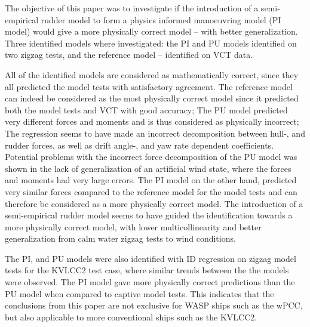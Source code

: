 %
The objective of this paper was to investigate if the introduction of a semi-empirical rudder model to form a physics informed manoeuvring model (PI model) would give a more physically correct model -- with better generalization.
Three identified models where investigated: the PI and PU models identified on two zigzag tests, and the reference model -- identified on VCT data.

All of the identified models are considered as mathematically correct, since they all predicted the model tests with satisfactory agreement.
The reference model can indeed be considered as the most physically correct model since it predicted both the model tests and VCT with good accuracy;
The PU model predicted very different forces and moments and is thus considered as physically incorrect; 
The regression seems to have made an incorrect decomposition between hull-, and rudder forces, as well as drift angle-, and yaw rate dependent coefficients.
Potential problems with the incorrect force decomposition of the PU model was shown in the lack of generalization of an artificial wind state, where the forces and moments had very large errors.
The PI model on the other hand, predicted very similar forces compared to the reference model for the model tests and can therefore be considered as a more physically correct model.
The introduction of a semi-empirical rudder model seems to have guided the identification towards a more physically correct model, with lower multicollinearity and better generalization from calm water zigzag tests to wind conditions.

The PI, and PU models were also identified with ID regression on zigzag model tests for the KVLCC2 test case, where similar trends between the the models were observed. The PI model gave more physically correct predictions than the PU model when compared to captive model tests. This indicates that the conclusions from this paper are not exclusive for WASP ships such as the wPCC, but also applicable to more conventional ships such as the KVLCC2. 

